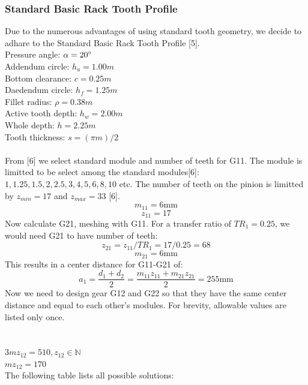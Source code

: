 \documentclass{article}
\begin{document}
\subsubsection{Standard Basic Rack Tooth Profile}
Due to the numerous advantages of using standard tooth geometry, we decide to adhare to the Standard Basic Rack Tooth Profile [5]. \\
Pressure angle: $\alpha = 20\degree$  \\
Addendum circle: $h_a = 1.00m$ \\
Bottom clearance: $c = 0.25m$ \\
Daedendum circle: $h_f = 1.25m$ \\
Fillet radius: $\rho = 0.38m$ \\
Active tooth depth: $h_w = 2.00m$ \\
Whole depth: $h = 2.25m$ \\
Tooth thickness: $s = (\pi m)/ 2$ \\
\\
From [6] we select standard module and number of teeth for G11.
The module is limitted to be select among the standard modules[6]: $1, 1.25, 1.5, 2, 2.5, 3, 4, 5, 6, 8, 10$ etc.
The number of teeth on the pinion is limitted by $z_{min} = 17$ and $z_{max} = 33$ [6]. \\
$$m_{11} = 6 \si{\milli\meter}$$
$$z_{11} = 17$$
Now calculate G21, meshing with G11.
For a transfer ratio of $TR_1 = 0.25$, we would need G21 to have number of teeth: \\
$$ z_{21} = z_{11} / TR_1 = 17 / 0.25 = 68 $$
$$ m_{21} = 6\si{\milli\meter}  $$
This results in a center distance for G11-G21 of: \\
$$ a_1 = \frac{d_1 + d_2}{2} = \frac{m_{11} z_{11} + m_{21} z_{21}}{2} = 255 \si{\milli\meter}$$
Now we need to design gear G12 and G22 so that they have the same center distance and equal to each other's modules.
For brevity, allowable values are listed only once. \\[0.3cm]
 \\[0.3cm]
 \\[0.3cm]
$ 3 m z_{12} = 510, z_{12} \in \mathbb{N} $ \\[0.3cm]
$ m z_{12} = 170 $ \\[0.3cm]
The following table lists all possible solutions: \\[0.3cm]
\end{document}
